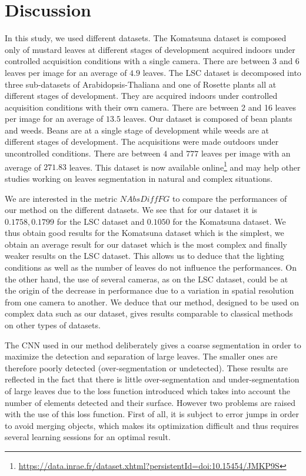\documentclass[../thesis.tex]{subfiles}
\begin{document}
    \section{Discussion}
    \label{sec:07-discussion}
    
    In this study, we used different datasets. The Komatsuna dataset is composed only of mustard leaves at different stages of development acquired indoors under controlled acquisition conditions with a single camera. There are between 3 and 6 leaves per image for an average of $4.9$ leaves. The LSC dataset is decomposed into three sub-datasets of Arabidopsis-Thaliana and one of Rosette plants all at different stages of development. They are acquired indoors under controlled acquisition conditions with their own camera. There are between 2 and 16 leaves per image for an average of $13.5$ leaves. Our dataset is composed of bean plants and weeds. Beans are at a single stage of development while weeds are at different stages of development. The acquisitions were made outdoors under uncontrolled conditions. There are between $4$ and $777$ leaves per image with an average of $271.83$ leaves. This dataset is now available online\footnote{\url{https://data.inrae.fr/dataset.xhtml?persistentId=doi:10.15454/JMKP9S}} and may help other studies working on leaves segmentation in natural and complex situations.
    
    We are interested in the metric $NAbsDiffFG$ to compare the performances of our method on the different datasets. We see that for our dataset it is $0.1758, 0.1799$ for the LSC dataset and $0.1050$ for the Komatsuna dataset. We thus obtain good results for the Komatsuna dataset which is the simplest, we obtain an average result for our dataset which is the most complex and finally weaker results on the LSC dataset. This allows us to deduce that the lighting conditions as well as the number of leaves do not influence the performances. On the other hand, the use of several cameras, as on the LSC dataset, could be at the origin of the decrease in performance due to a variation in spatial resolution from one camera to another. We deduce that our method, designed to be used on complex data such as our dataset, gives results comparable to classical methods on other types of datasets.
    
    The CNN used in our method deliberately gives a coarse segmentation in order to maximize the detection and separation of large leaves. The smaller ones are therefore poorly detected (over-segmentation or undetected). These results are reflected in the fact that there is little over-segmentation and under-segmentation of large leaves due to the loss function introduced which takes into account the number of elements detected and their surface. However two problems are raised with the use of this loss function. First of all, it is subject to error jumps in order to avoid merging objects, which makes its optimization difficult and thus requires several learning sessions for an optimal result.
    
\end{document}

